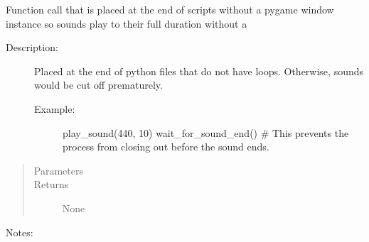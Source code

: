\documentclass[letterpaper,10pt,english]{sphinxmanual}
\begin{document}
\begin{fulllineitems}
\begin{fulllineitems}
\label{\detokenize{dpav:dpav.audio.Audio.wait_for_sound_end}}
\sphinxAtStartPar
Function call that is placed at the end of scripts without a pygame window instance so sounds play to their full duration without a
\begin{description}
\item[{Description:}] \leavevmode
\sphinxAtStartPar
Placed at the end of python files that do not have loops. Otherwise, sounds would be cut off prematurely.
\begin{description}
\item[{Example:}] \leavevmode
\sphinxAtStartPar
play\_sound(440, 10)
wait\_for\_sound\_end() \# This prevents the process from closing out before the sound ends.

\end{description}

\end{description}
\begin{quote}\begin{description}
\item[{Parameters}] \leavevmode
\sphinxAtStartPar
{} \textendash{} 

\item[{Returns}] \leavevmode
\sphinxAtStartPar
None

\end{description}\end{quote}

\sphinxAtStartPar
Notes:

\end{fulllineitems}


\end{fulllineitems}

\end{document}
